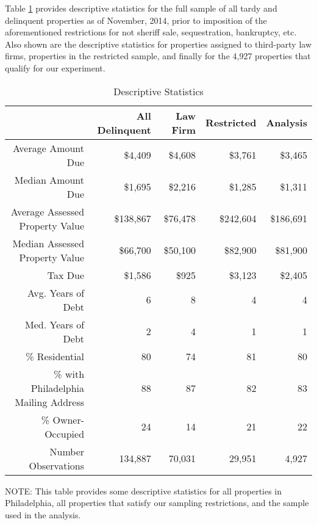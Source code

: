 \documentclass[12pt,titlepage]{article}
\begin{document}
Table \ref{table:descriptives} provides descriptive statistics for the full sample 
of all tardy and delinquent properties as of November, 2014, prior to 
imposition of the aforementioned restrictions for not sheriff sale, 
sequestration, bankruptcy, etc.   Also shown 
are the descriptive statistics for properties assigned to third-party 
law firms, properties in the restricted sample, and finally for the 
4,927 properties that qualify for our experiment.


\begin{table}[ht]
\centering
\caption{Descriptive Statistics} 
\label{table:descriptives}
\begin{tabular}{|r|r|r|r|r|}
  \hline
 & All Delinquent & Law Firm & Restricted & Analysis \\ 
  \hline
Average Amount Due & \$4,409 & \$4,608 & \$3,761 & \$3,465 \\ 
  Median Amount Due & \$1,695 & \$2,216 & \$1,285 & \$1,311 \\ 
  Average Assessed Property Value & \$138,867 & \$76,478 & \$242,604 & \$186,691 \\ 
  Median Assessed Property Value & \$66,700 & \$50,100 & \$82,900 & \$81,900 \\ 
  Tax Due & \$1,586 & \$925 & \$3,123 & \$2,405 \\ 
  Avg. Years of Debt & 6 & 8 & 4 & 4 \\ 
  Med. Years of Debt & 2 & 4 & 1 & 1 \\ 
  \% Residential & 80 & 74 & 81 & 80 \\ 
  \% with Philadelphia Mailing Address & 88 & 87 & 82 & 83 \\ 
  \% Owner-Occupied & 24 & 14 & 21 & 22 \\ 
  Number Observations & 134,887 & 70,031 & 29,951 & 4,927 \\ 
   \hline
\end{tabular}
NOTE: This table provides some descriptive statistics for all
properties in Philadelphia, all properties that satisfy our sampling
restrictions, and the sample used in the analysis.
\end{table}
\end{document}
